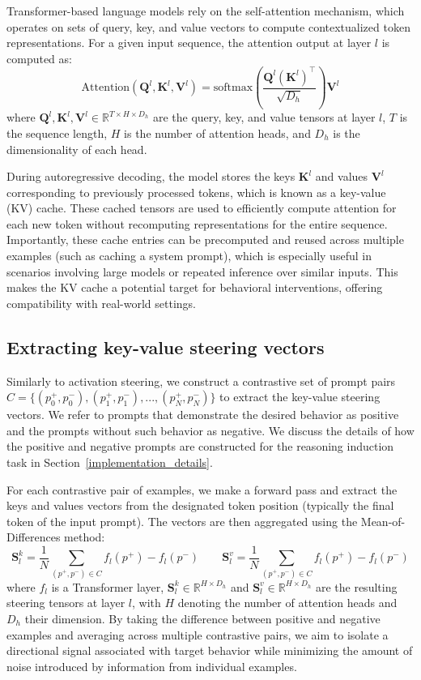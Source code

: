 \documentclass{article} %
\begin{document}
Transformer-based language models rely on the self-attention mechanism, which operates on sets of query, key, and value vectors to compute contextualized token representations. For a given input sequence, the attention output at layer \( l \) is computed as:
\[
\text{Attention}(\boldsymbol{Q}^l, \boldsymbol{K}^l, \boldsymbol{V}^l) = \text{softmax} \left( \frac{\boldsymbol{Q}^l (\boldsymbol{K}^l)^\top}{\sqrt{D_h}} \right) \boldsymbol{V}^l
\]
where \( \boldsymbol{Q}^l, \boldsymbol{K}^l, \boldsymbol{V}^l \in \mathbb{R}^{T \times H \times D_h} \) are the query, key, and value tensors at layer \( l \), \( T \) is the sequence length, \( H \) is the number of attention heads, and \( D_h \) is the dimensionality of each head.

During autoregressive decoding, the model stores the keys \( \boldsymbol{K}^l \) and values \( \boldsymbol{V}^l \) corresponding to previously processed tokens, which is known as a key-value (KV) cache. These cached tensors are used to efficiently compute attention for each new token without recomputing representations for the entire sequence. Importantly, these cache entries can be precomputed and reused across multiple examples (such as caching a system prompt), which is especially useful in scenarios involving large models or repeated inference over similar inputs. This makes the KV cache a potential target for behavioral interventions, offering compatibility with real-world settings.


\subsection{Extracting key-value steering vectors}

Similarly to activation steering, we construct a contrastive set of prompt pairs \(C = \{(p_0^+, p_0^-), (p_1^+, p_1^-), ..., (p_N^+, p_N^-)\}\) to extract the key-value steering vectors. We refer to prompts that demonstrate the desired behavior as positive and the prompts without such behavior as negative. We discuss the details of how the positive and negative prompts are constructed for the reasoning induction task in Section~\ref{implementation_details}.

For each contrastive pair of examples, we make a forward pass and extract the keys and values vectors from the designated token position (typically the final token of the input prompt). The vectors are then aggregated using the Mean-of-Differences method:
\[\boldsymbol{S}^k_l = \frac{1}{N} \sum_{(p^+, p^-) \in C} f_l(p^+) - f_l(p^-)
\qquad
\boldsymbol{S}^v_l = \frac{1}{N} \sum_{(p^+, p^-) \in C} f_l(p^+) - f_l(p^-)\]
where \( f_l \) is a Transformer layer, \( \boldsymbol{S}^k_l \in \mathbb{R}^{H \times D_h} \) and \( \boldsymbol{S}^v_l \in \mathbb{R}^{H \times D_h} \) are the resulting steering tensors at layer \(l\), with \( H \) denoting the number of attention heads and \( D_h \) their dimension. By taking the difference between positive and negative examples and averaging across multiple contrastive pairs, we aim to isolate a directional signal associated with target behavior while minimizing the amount of noise introduced by information from individual examples.
\end{document}
